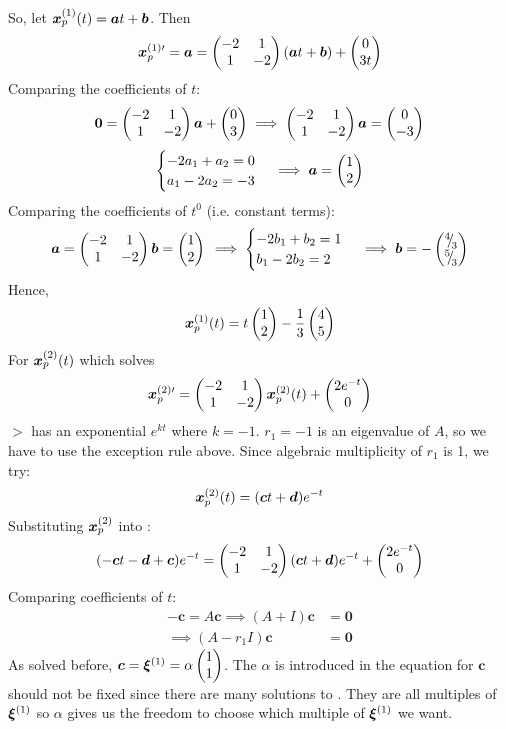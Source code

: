 \begin{eg}
	So, let $\bm{x}_p^{(1)}(t) = \bm{a}t + \bm{b}$. Then 
	\[ 
	\bm{x}_p^{(1)\prime} = \bm{a} = \begin{pmatrix}-2&1\\1&-2\end{pmatrix}(\bm{a}t + \bm{b}) + \begin{pmatrix}0\\3t\end{pmatrix}
	\]
	Comparing the coefficients of $t$:
	\[
	\bm{0} = \begin{pmatrix}-2&1\\1&-2\end{pmatrix} \bm{a} + \begin{pmatrix}0\\3\end{pmatrix} \implies \begin{pmatrix}-2&1\\1&-2\end{pmatrix} \bm{a} = \begin{pmatrix}0\\-3\end{pmatrix}
	\]
	\[
	\begin{cases}
		-2a_1 + a_2 = 0 \\
		a_1 -2a_2 = -3
	\end{cases}
	\implies \bm{a} = \begin{pmatrix}1\\2\end{pmatrix}
	\]
	Comparing the coefficients of $t^0$ (i.e. constant terms): 
	\[
	\bm{a} = \begin{pmatrix}-2&1\\1&-2\end{pmatrix} \bm{b} = \begin{pmatrix}1\\2\end{pmatrix} \\
	\implies \begin{cases}
		-2b_1 + b_2 = 1 \\
		b_1 -2b_2 = 2
	\end{cases}
	\implies \bm{b} = -\begin{pmatrix}{}^{4}{\mskip -5mu/\mskip -3mu}_{3} \\ {}^{5}{\mskip -5mu/\mskip -3mu}_{3}\end{pmatrix}
	\]
	Hence, 
	\[
	\bm{x}_p^{(1)}(t) = t\begin{pmatrix}1\\2\end{pmatrix} - \frac{1}{3}\begin{pmatrix}4\\5\end{pmatrix}
	\]
	For $\bm{x}_p^{(2)}(t)$ which solves 
	\begin{equation}\label{eq1.7.8}
		\bm{x}_p^{(2)\prime} = \begin{pmatrix}-2&1 \\ 1&-2\end{pmatrix}\bm{x}_p^{(2)}(t) + \begin{pmatrix}2e^{-t} \\ 0\end{pmatrix}
	\end{equation}
	$\gt$ has an exponential $e^{kt}$ where $k =-1$. $r_1 = -1$ is an eigenvalue of $A$, so we have to use the exception rule above. Since algebraic multiplicity of $r_1$ is 1, we try:
	\[
	\bm{x}_p^{(2)}(t) = (\bm{c}t + \bm{d})e^{-t}
	\]
	Substituting $\bm{x}_p^{(2)}$ into :
	\[
	(-\bm{c}t - \bm{d} + \bm{c}) e^{-t} = \begin{pmatrix}-2&1 \\ 1&-2\end{pmatrix}(\bm{c}t + \bm{d})e^{-t} + \begin{pmatrix}2e^{-t}\\0\end{pmatrix}
	\]
	Comparing coefficients of $t$:
	\begin{equation}\label{eq:nonhomc}
		\begin{alignedat}{1}
			-\bm{c} = A\bm{c} \implies (A + I)\bm{c} &= \bm{0} \\
			\implies (A - r_1I) \bm{c} &= \bm{0}
		\end{alignedat}
	\end{equation}
	As solved before, $\bm{c} = \bm{\xi}^{(1)} = \alpha
	\begin{pmatrix} 1\\1\end{pmatrix}$. The $\alpha$ is introduced in the equation for $\bm{c}$ should not be fixed since there are many solutions to . They are all multiples of $\bm{\xi}^{(1)}$ so $\alpha$ gives us the freedom to choose which multiple of $\bm{\xi}^{(1)}$ we want.
	

\end{eg}
